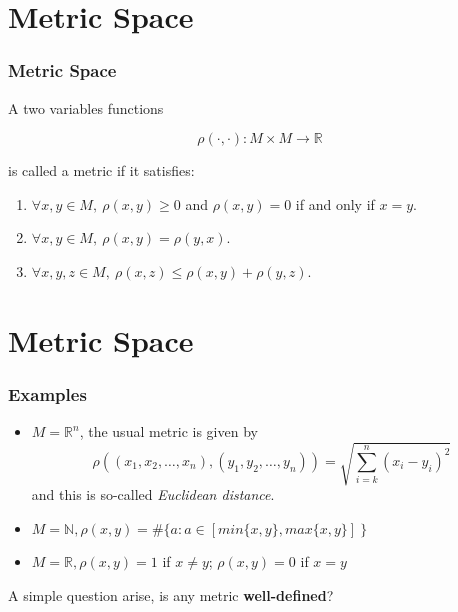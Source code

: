 \documentclass[12pt, t]{beamer}
\renewcommand{\emph}[1]{{\color{Turquoise3}\textsl{#1}}}
\begin{document}
\section{Metric Space}
\begin{frame}
    \frametitle{Metric Space}
A two variables functions 

\begin{equation*}
    \rho(\cdot,\cdot):M\times M \rightarrow \mathbb{R}
\end{equation*}

is called a metric if it satisfies:

\begin{enumerate}
    \item $\forall x,y\in M,\ \rho (x,y) \geq 0$ and $\rho (x,y)=0$ if and only if $x=y$.
    \item  $\forall x,y\in M,\ \rho (x,y)=\rho (y,x)$.
    \item  $\forall x,y,z\in M,\ \rho (x,z)\leq \rho (x,y)+\rho (y,z)$.
\end{enumerate}


\end{frame}

\section{Metric Space}
\begin{frame}
    \frametitle{Examples}
\begin{itemize}
    \item $M=\mathbb{R}^n$, the usual metric is given by 
        \begin{equation*}
            \rho ( (x_1,x_2,\dots,x_n), (y_1,y_2,\dots,y_n)) = \sqrt{\sum^{n}_{i=k}(x_i-y_i)^2 }
        \end{equation*} 
        and this is so-called \emph{Euclidean distance}.
    \item $M=\mathbb{N}, \rho(x,y)= \#\{ a:a\in [min\{x,y\},max\{x,y\}]\ \} $
    \item $M=\mathbb{R},\rho (x,y)=1 $ if $x\neq y$; $\rho (x,y)=0$ if $x=y$
\end{itemize}
\vspace{1em}
A simple question arise, is any metric \textbf{well-defined}?
\end{frame}
\end{document}
